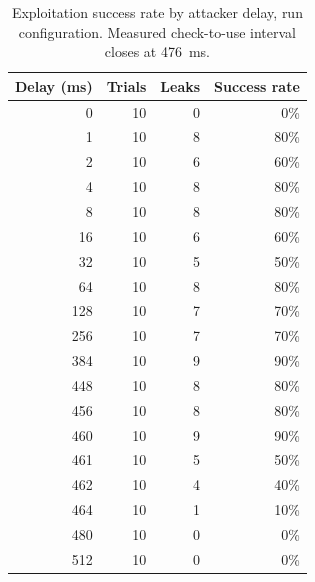 \begin{table}[ht]
\centering
\begin{tabular}{rrrr}
\hline
Delay (ms) & Trials & Leaks & Success rate \\
\hline
0 & 10 & 0 & 0\% \\
1 & 10 & 8 & 80\% \\
2 & 10 & 6 & 60\% \\
4 & 10 & 8 & 80\% \\
8 & 10 & 8 & 80\% \\
16 & 10 & 6 & 60\% \\
32 & 10 & 5 & 50\% \\
64 & 10 & 8 & 80\% \\
128 & 10 & 7 & 70\% \\
256 & 10 & 7 & 70\% \\
384 & 10 & 9 & 90\% \\
448 & 10 & 8 & 80\% \\
456 & 10 & 8 & 80\% \\
460 & 10 & 9 & 90\% \\
461 & 10 & 5 & 50\% \\
462 & 10 & 4 & 40\% \\
464 & 10 & 1 & 10\% \\
480 & 10 & 0 & 0\% \\
512 & 10 & 0 & 0\% \\
\hline
\end{tabular}
\caption{Exploitation success rate by attacker delay, run configuration. Measured check-to-use interval closes at 476~ms.}
\label{tab:success-run}
\end{table}
